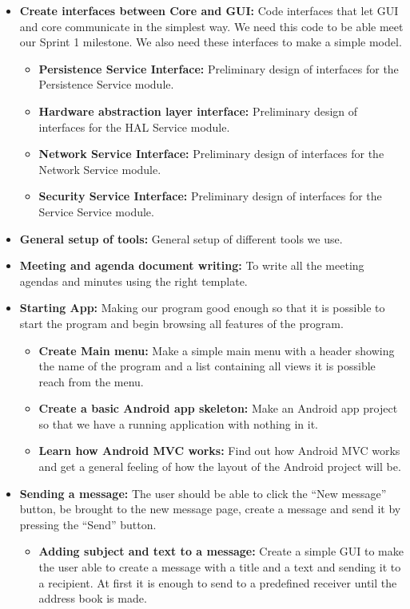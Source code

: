 \begin{itemize}
\item{}\textbf{Create interfaces between Core and GUI:} Code interfaces that let GUI and core communicate in the simplest way. We need this code to be able meet our Sprint 1 milestone. We also need these interfaces to make a simple model.
\begin{itemize}
\item{}\textbf{Persistence Service Interface:} Preliminary design of interfaces for the Persistence Service module.
\item{}\textbf{Hardware abstraction layer interface:} Preliminary design of interfaces for the HAL Service module.
\item{}\textbf{Network Service Interface:} Preliminary design of interfaces for the Network Service module.
\item{}\textbf{Security Service Interface:} Preliminary design of interfaces for the Service Service module.
\end{itemize}
\item{}\textbf{General setup of tools:} General setup of different tools we use.
\item{}\textbf{Meeting and agenda document writing:} To write all the meeting agendas and minutes using the right template.
\item{}\textbf{Starting App:} Making our program good enough so that it is possible to start the program and begin browsing all features of the program.
\begin{itemize}
\item{}\textbf{Create Main menu:} Make a simple main menu with a header showing the name of the program and a list containing all views it is possible reach from the menu.
\item{}\textbf{Create a basic Android app skeleton:} Make an Android app project so that we have a running application with nothing in it.
\item{}\textbf{Learn how Android MVC works:} Find out how Android MVC works and get a general feeling of how the layout of the Android project will be.
\end{itemize}
\item{}\textbf{Sending a message:} The user should be able to click the “New message” button, be brought to the new message page, create a message and send it by pressing the “Send” button.
\begin{itemize}
\item{}\textbf{Adding subject and text to a message:} Create a simple GUI to make the user able to create a message with a title and a text and sending it to a recipient. At first it is enough to send to a predefined receiver until the address book is made.

\end{itemize}
\end{itemize}
